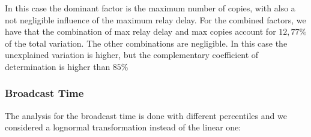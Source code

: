 In this case the dominant factor is the maximum number of copies, with also a
not negligible influence of the maximum relay delay. For the combined factors,
we have that the combination of max relay delay and max copies account for
\(12,77\%\) of the total variation. The other combinations are negligible.  In
this case the unexplained variation is higher, but the complementary coefficient
of determination is higher than \(85\%\)

\subsubsection{Broadcast Time}

The analysis for the broadcast time is done with different percentiles and we
considered a lognormal transformation instead of the linear one:


